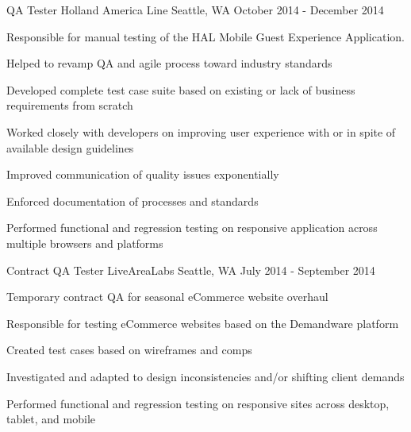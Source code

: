 \begin{cventries}
\cventry
{QA Tester} %
{Holland America Line} %
{Seattle, WA} %
{October 2014 - December 2014} %
{
\begin{cvitems}
\item {Responsible for manual testing of the HAL Mobile Guest Experience Application.}
\item {Helped to revamp QA and agile process toward industry standards}
\item {Developed complete test case suite based on existing or lack of business requirements from scratch}
\item {Worked closely with developers on improving user experience with or in spite of available design guidelines}
\item {Improved communication of quality issues exponentially}
\item {Enforced documentation of processes and standards}
\item {Performed functional and regression testing on responsive application across multiple browsers and platforms}
\end{cvitems}
}

\cventry
{Contract QA Tester} %
{LiveAreaLabs} %
{Seattle, WA} %
{July 2014 - September 2014} %
{
\begin{cvitems}
\item {Temporary contract QA for seasonal eCommerce website overhaul}
\item {Responsible for testing eCommerce websites based on the Demandware platform}
\item {Created test cases based on wireframes and comps}
\item {Investigated and adapted to design inconsistencies and/or shifting client demands}
\item {Performed functional and regression testing on responsive sites across desktop, tablet, and mobile}
\end{cvitems}
}


\end{cventries}
